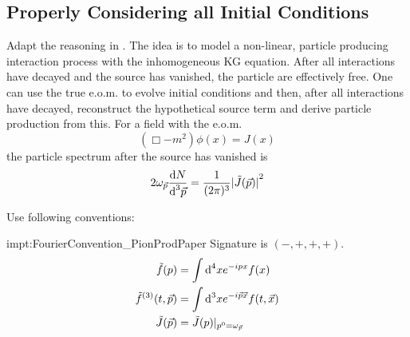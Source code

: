 \subsection{Properly Considering all Initial Conditions}

Adapt the reasoning in \cite{Amelino-CameliaEtAl_1997}. The idea is to model a non-linear, particle producing interaction process with the inhomogeneous KG equation. After all interactions have decayed and the source has vanished, the particle are effectively free. One can use the true e.o.m. to evolve initial conditions and then, after all interactions have decayed, reconstruct the hypothetical source term and derive particle production from this. For a field with the e.o.m.
\begin{equation}
    (\Box-m^2)\phi(x)=J(x)
\end{equation}
the particle spectrum after the source has vanished is
\begin{equation}
    2\omega_{\vec{p}}\frac{\text{d} N}{\text{d}^3\vec{p}}=\frac{1}{(2\pi)^3}{\vert\tilde{J}(\vec{p})\vert}^2
\end{equation}

Use following conventions:
\begin{impt}{impt:FourierConvention_PionProdPaper}
    Signature is $(-,+,+,+)$.
    \begin{subequations}
        \begin{align}
            \tilde{f}(p)               & =\int\text{d}^4x e^{-{i} px}f(x)                     \\
            \tilde{f}^{(3)}(t,\vec{p}) & =\int\text{d}^3xe^{-{i}\vec{p}{\vec{x}}}f(t,\vec{x}) \\
            \tilde{J}(\vec{p})         & =\tilde{J}(p)\vert_{p^0=\omega_{\vec{p}}}
        \end{align}
    \end{subequations}
\end{impt}

